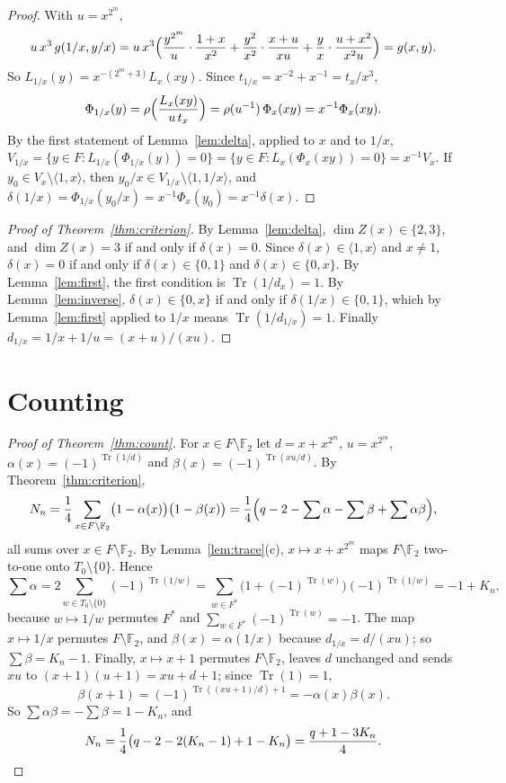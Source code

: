 \documentclass[11pt,a4paper,reqno]{amsart}
\theoremstyle{remark}
\numberwithin{equation}{section}
\newcommand{\F}{\mathbb{F}}
\newcommand{\Tr}{\operatorname{Tr}}
\begin{document}
\begin{proof}
With $u=x^{2^m}$,
\[
u\,x^3\,g(1/x,y/x)=u\,x^3\Bigl(\frac{y^{2^m}}{u}\cdot\frac{1+x}{x^2}+\frac{y^2}{x^2}\cdot\frac{x+u}{xu}+\frac yx\cdot\frac{u+x^2}{x^2u}\Bigr)=g(x,y).
\]
So $L_{1/x}(y)=x^{-(2^m+3)}L_x(xy)$. Since $t_{1/x}=x^{-2}+x^{-1}=t_x/x^3$,
\[
\Phi_{1/x}(y)=\rho\Bigl(\frac{L_x(xy)}{u\,t_x}\Bigr)=\rho(u^{-1})\,\Phi_x(xy)=x^{-1}\Phi_x(xy).
\]
By the first statement of Lemma~\ref{lem:delta}, applied to $x$ and to $1/x$, $V_{1/x}=\{y\in F:L_{1/x}(\Phi_{1/x}(y))=0\}=\{y\in F:L_x(\Phi_x(xy))=0\}=x^{-1}V_x$. If $y_0\in V_x\setminus\langle1,x\rangle$, then $y_0/x\in V_{1/x}\setminus\langle1,1/x\rangle$, and $\delta(1/x)=\Phi_{1/x}(y_0/x)=x^{-1}\Phi_x(y_0)=x^{-1}\delta(x)$.
\end{proof}

\begin{proof}[Proof of Theorem~\ref{thm:criterion}]
By Lemma~\ref{lem:delta}, $\dim Z(x)\in\{2,3\}$, and $\dim Z(x)=3$ if and only if $\delta(x)=0$. Since $\delta(x)\in\langle1,x\rangle$ and $x\ne1$, $\delta(x)=0$ if and only if $\delta(x)\in\{0,1\}$ and $\delta(x)\in\{0,x\}$. By Lemma~\ref{lem:first}, the first condition is $\Tr(1/d_x)=1$. By Lemma~\ref{lem:inverse}, $\delta(x)\in\{0,x\}$ if and only if $\delta(1/x)\in\{0,1\}$, which by Lemma~\ref{lem:first} applied to $1/x$ means $\Tr(1/d_{1/x})=1$. Finally $d_{1/x}=1/x+1/u=(x+u)/(xu)$.
\end{proof}

\section{Counting}\label{sec:count}

\begin{proof}[Proof of Theorem~\ref{thm:count}]
For $x\in F\setminus\F_2$ let $d=x+x^{2^m}$, $u=x^{2^m}$, $\alpha(x)=(-1)^{\Tr(1/d)}$ and $\beta(x)=(-1)^{\Tr(xu/d)}$. By Theorem~\ref{thm:criterion},
\[
N_n=\frac14\sum_{x\in F\setminus\F_2}\bigl(1-\alpha(x)\bigr)\bigl(1-\beta(x)\bigr)=\frac14\Bigl(q-2-\sum\alpha-\sum\beta+\sum\alpha\beta\Bigr),
\]
all sums over $x\in F\setminus\F_2$. By Lemma~\ref{lem:trace}(c), $x\mapsto x+x^{2^m}$ maps $F\setminus\F_2$ two-to-one onto $T_0\setminus\{0\}$. Hence
\[
\sum\alpha=2\sum_{w\in T_0\setminus\{0\}}(-1)^{\Tr(1/w)}=\sum_{w\in F^*}\bigl(1+(-1)^{\Tr(w)}\bigr)(-1)^{\Tr(1/w)}=-1+K_n ,
\]
because $w\mapsto1/w$ permutes $F^*$ and $\sum_{w\in F^*}(-1)^{\Tr(w)}=-1$. The map $x\mapsto1/x$ permutes $F\setminus\F_2$, and $\beta(x)=\alpha(1/x)$ because $d_{1/x}=d/(xu)$; so $\sum\beta=K_n-1$. Finally, $x\mapsto x+1$ permutes $F\setminus\F_2$, leaves $d$ unchanged and sends $xu$ to $(x+1)(u+1)=xu+d+1$; since $\Tr(1)=1$,
\[
\beta(x+1)=(-1)^{\Tr((xu+1)/d)+1}=-\alpha(x)\beta(x).
\]
So $\sum\alpha\beta=-\sum\beta=1-K_n$, and
\[
N_n=\frac14\bigl(q-2-2(K_n-1)+1-K_n\bigr)=\frac{q+1-3K_n}{4}. \qedhere
\]
\end{proof}
\end{document}
